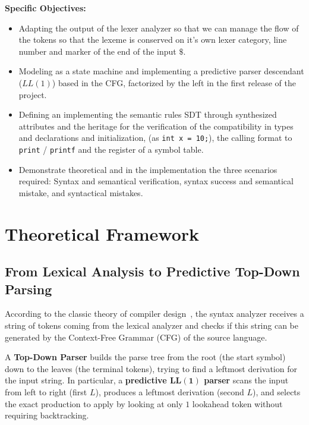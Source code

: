 \documentclass[letterpaper,12pt,oneside]{article}
\begin{document}
\textbf{Specific Objectives:}
\begin{itemize}
    \item Adapting the output of the lexer analyzer so that we can manage the flow of the tokens so that the lexeme is conserved on it's own lexer category, line number and marker of the end of the input $\$ $.
    \item Modeling as a state machine and implementing a predictive parser descendant ($LL(1)$) based in the CFG, factorized by the left in the first release of the project. 
    \item Defining an implementing the semantic rules SDT through synthesized attributes and the heritage for the verification of the compatibility in types and declarations and initialization, (as \texttt{int x = 10;}), the calling format to \texttt{print} / \texttt{printf} and the register of a symbol table.
    \item Demonstrate theoretical and in the implementation the three scenarios required: Syntax and semantical verification, syntax success and semantical mistake, and syntactical mistakes. 
\end{itemize}

\section{Theoretical Framework}

\subsection{From Lexical Analysis to Predictive Top-Down Parsing}
According to the classic theory of compiler design~\cite{10.5555/576122}, the syntax analyzer receives a string of tokens coming from the lexical analyzer and checks if this string can be generated by the Context-Free Grammar (CFG) of the source language.

A \textbf{Top-Down Parser} builds the parse tree from the root (the start symbol) down to the leaves (the terminal tokens), trying to find a leftmost derivation for the input string. In particular, a \textbf{predictive $\mathbf{LL(1)}$ parser} scans the input from left to right (first $L$), produces a leftmost derivation (second $L$), and selects the exact production to apply by looking at only $1$ lookahead token without requiring backtracking.
\end{document}
